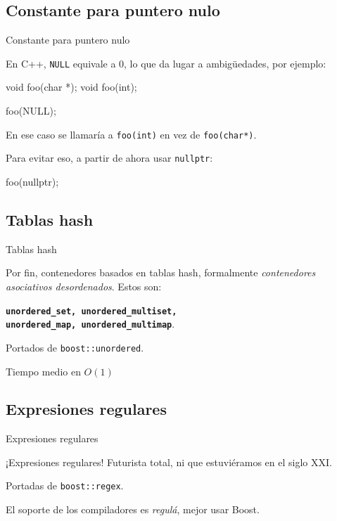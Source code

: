 \documentclass[8pt,xcolor=svgnames]{beamer}
\begin{document}
\subsection{Constante para puntero nulo}

\begin{frame}[fragile]{Constante para puntero nulo}

  En C++, \texttt{NULL} equivale a 0, lo que da lugar a ambigüedades, por
  ejemplo:

  \begin{cppcode}
void foo(char *);
void foo(int);

foo(NULL);    
  \end{cppcode}

  En ese caso se llamaría a \texttt{foo(int)} en vez de
  \texttt{foo(char*)}. 

  Para evitar eso, a partir de ahora usar \texttt{nullptr}:

  \begin{cppcode}
foo(nullptr);    
  \end{cppcode}
  
\end{frame}

\subsection{Tablas hash}

\begin{frame}[fragile]{Tablas hash}

  \centering

  Por fin, contenedores basados en tablas hash, formalmente \textit{contenedores
    asociativos desordenados}. Estos son:

  \textbf{\texttt{unordered\_set, unordered\_multiset, \\ unordered\_map, unordered\_multimap}}.

  Portados de \texttt{boost::unordered}.

  Tiempo medio en $O(1)$
  
\end{frame}

\subsection{Expresiones regulares}

\begin{frame}[fragile]{Expresiones regulares}

\centering

¡Expresiones regulares! Futurista total, ni que estuviéramos en el siglo XXI.

Portadas de \texttt{boost::regex}. 

El soporte de los compiladores es \textit{regulá}, mejor usar Boost.
 
\end{frame}
\end{document}

